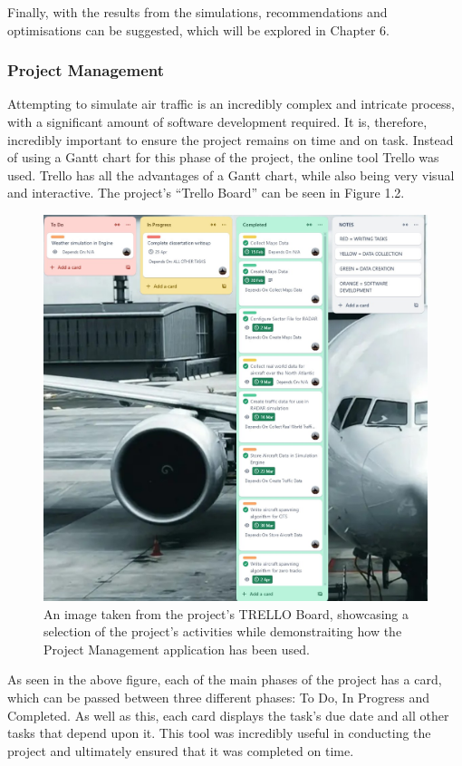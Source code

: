 \documentclass[stu, a4paper, 12pt, floatsintext]{apa7}
\numberwithin{figure}{section}
\numberwithin{table}{section}
\numberwithin{equation}{section}
\begin{document}
Finally, with the results from the simulations, recommendations and optimisations can be suggested, which will be explored in Chapter 6. 
\subsubsection{Project Management}
Attempting to simulate air traffic is an incredibly complex and intricate process, with a significant amount of software development required. It is, therefore, incredibly important to ensure the project remains on time and on task. Instead of using a Gantt chart for this phase of the project, the online tool Trello was used. Trello has all the advantages of a Gantt chart, while also being very visual and interactive. The project’s “Trello Board” can be seen in Figure 1.2. 

\begin{figure}[H]
    \caption{An image taken from the project's TRELLO Board, showcasing a selection of the project's activities while demonstraiting how the Project Management application has been used.}
    \label{fig:1.2}
    \centering
    \includegraphics[width=1.1\textwidth]{pictures/Figure 1.2.jpg}    
\end{figure}

As seen in the above figure, each of the main phases of the project has a card, which can be passed between three different phases: To Do, In Progress and Completed. As well as this, each card displays the task’s due date and all other tasks that depend upon it. This tool was incredibly useful in conducting the project and ultimately ensured that it was completed on time.
\end{document}
